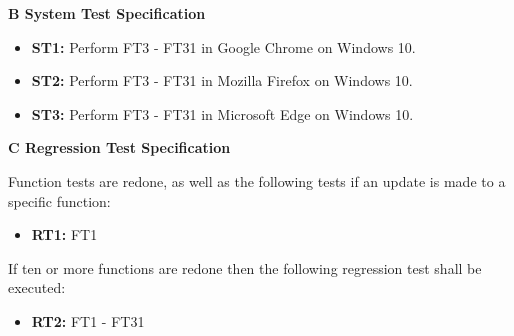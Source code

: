 \documentclass{article}
\begin{document}
		
		\newpage
		\begin{flushleft}
		{\large \textbf{B System Test Specification}}
		\end{flushleft}
		
		
		
		\begin{itemize}
		
  			\item \textbf{ST1:} Perform FT3 - FT31 in Google Chrome on Windows 10. 	
  			
  			\item \textbf{ST2:} Perform FT3 - FT31 in Mozilla Firefox on Windows 10. 
  			
  			\item \textbf{ST3:} Perform FT3 - FT31 in Microsoft Edge on Windows 10. 					
  			
  			
		\end{itemize}
		
		\newpage
		\begin{flushleft}
		{\large \textbf{C Regression Test Specification}}
		\end{flushleft}
			
		\begin{flushleft}
		Function tests are redone, as well as the following tests if an update is made to a specific function:
		\end{flushleft}
		
		\begin{itemize}
		
  			\item \textbf{RT1:} FT1
  			
			  					
		\end{itemize}
		
		\begin{flushleft}
			If ten or more functions are redone then the following regression test shall be executed:
			\end{flushleft}	
		
		\begin{itemize}			
  			
  			\item \textbf{RT2:} FT1 - FT31		

		\end{itemize}
		
		
			
		


\end{document}
